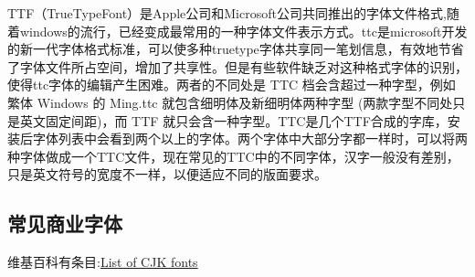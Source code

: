 TTF（TrueTypeFont）是Apple公司和Microsoft公司共同推出的字体文件格式,随着windows的流行，已经变成最常用的一种字体文件表示方式。ttc是microsoft开发的新一代字体格式标准，可以使多种truetype字体共享同一笔划信息，有效地节省了字体文件所占空间，增加了共享性。但是有些软件缺乏对这种格式字体的识别，使得ttc字体的编辑产生困难。两者的不同处是 TTC 档会含超过一种字型，例如繁体 Windows 的 Ming.ttc 就包含细明体及新细明体两种字型 (两款字型不同处只是英文固定间距)，而 TTF 就只会含一种字型。TTC是几个TTF合成的字库，安装后字体列表中会看到两个以上的字体。两个字体中大部分字都一样时，可以将两种字体做成一个TTC文件，现在常见的TTC中的不同字体，汉字一般没有差别，只是英文符号的宽度不一样，以便适应不同的版面要求。


























\subsection{常见商业字体}
维基百科有条目:\href{http://en.wikipedia.org/wiki/List_of_CJK_fonts}{List of CJK fonts}

